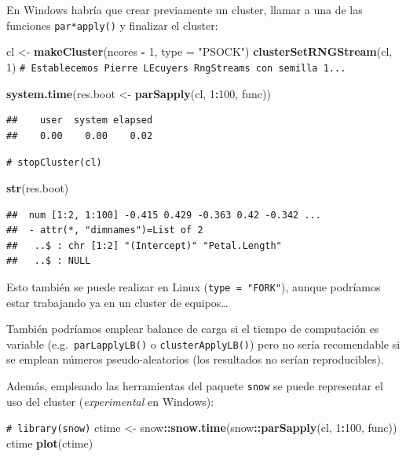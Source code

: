 \documentclass[
]{book}
\newenvironment{Shaded}{\begin{snugshade}}{\end{snugshade}}
\newcommand{\AttributeTok}[1]{\textcolor[rgb]{0.13,0.29,0.53}{#1}}
\newcommand{\CommentTok}[1]{\textcolor[rgb]{0.56,0.35,0.01}{\textit{#1}}}
\newcommand{\DecValTok}[1]{\textcolor[rgb]{0.00,0.00,0.81}{#1}}
\newcommand{\FunctionTok}[1]{\textcolor[rgb]{0.13,0.29,0.53}{\textbf{#1}}}
\newcommand{\NormalTok}[1]{#1}
\newcommand{\OtherTok}[1]{\textcolor[rgb]{0.56,0.35,0.01}{#1}}
\newcommand{\SpecialCharTok}[1]{\textcolor[rgb]{0.81,0.36,0.00}{\textbf{#1}}}
\newcommand{\StringTok}[1]{\textcolor[rgb]{0.31,0.60,0.02}{#1}}
\theoremstyle{break}
\theoremstyle{nonumberplain}
\renewcommand{\CommentTok}[1]{\textcolor[rgb]{0.41,0.41,0.41}{\texttt{#1}}}
\begin{document}
En Windows habría que crear previamente un cluster, llamar a una de las funciones
\texttt{par*apply()} y finalizar el cluster:

\begin{Shaded}
\begin{Highlighting}[]
\NormalTok{cl }\OtherTok{\textless{}{-}} \FunctionTok{makeCluster}\NormalTok{(ncores }\SpecialCharTok{{-}} \DecValTok{1}\NormalTok{, }\AttributeTok{type =} \StringTok{"PSOCK"}\NormalTok{)}
\FunctionTok{clusterSetRNGStream}\NormalTok{(cl, }\DecValTok{1}\NormalTok{) }\CommentTok{\# Establecemos Pierre L\textquotesingle{}Ecuyer\textquotesingle{}s RngStreams con semilla 1...}

\FunctionTok{system.time}\NormalTok{(res.boot }\OtherTok{\textless{}{-}} \FunctionTok{parSapply}\NormalTok{(cl, }\DecValTok{1}\SpecialCharTok{:}\DecValTok{100}\NormalTok{, func))}
\end{Highlighting}
\end{Shaded}

\begin{verbatim}
##    user  system elapsed 
##    0.00    0.00    0.02
\end{verbatim}

\begin{Shaded}
\begin{Highlighting}[]
\CommentTok{\# stopCluster(cl)}

\FunctionTok{str}\NormalTok{(res.boot)}
\end{Highlighting}
\end{Shaded}

\begin{verbatim}
##  num [1:2, 1:100] -0.415 0.429 -0.363 0.42 -0.342 ...
##  - attr(*, "dimnames")=List of 2
##   ..$ : chr [1:2] "(Intercept)" "Petal.Length"
##   ..$ : NULL
\end{verbatim}

Esto también se puede realizar en Linux (\texttt{type\ =\ "FORK"}),
aunque podríamos estar trabajando ya en un cluster de equipos\ldots{}

También podríamos emplear balance de carga si el tiempo de computación es variable
(e.g.~\texttt{parLapplyLB()} o \texttt{clusterApplyLB()}) pero no sería recomendable si se emplean
números pseudo-aleatorios (los resultados no serían reproducibles).

Además, empleando las herramientas del paquete \texttt{snow} se puede representar el uso
del cluster (\emph{experimental} en Windows):

\begin{Shaded}
\begin{Highlighting}[]
\CommentTok{\# library(snow)}
\NormalTok{ctime }\OtherTok{\textless{}{-}}\NormalTok{ snow}\SpecialCharTok{::}\FunctionTok{snow.time}\NormalTok{(snow}\SpecialCharTok{::}\FunctionTok{parSapply}\NormalTok{(cl, }\DecValTok{1}\SpecialCharTok{:}\DecValTok{100}\NormalTok{, func))}
\NormalTok{ctime}
\FunctionTok{plot}\NormalTok{(ctime)}
\end{Highlighting}
\end{Shaded}
\end{document}
